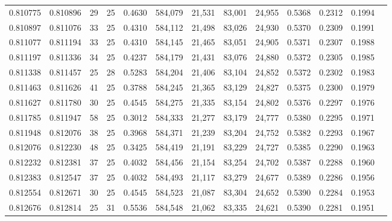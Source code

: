 \begin{tabular}{rrrrrrrrrrrrr}
0.810775 & 0.810896 &    29 &  25 &                                     0.4630 & 584,079 &  21,531 &  83,001 &  24,955 & 0.5368 & 0.2312 & 0.1994 \\
0.810897 & 0.811076 &    33 &  25 &                                     0.4310 & 584,112 &  21,498 &  83,026 &  24,930 & 0.5370 & 0.2309 & 0.1991 \\
0.811077 & 0.811194 &    33 &  25 &                                     0.4310 & 584,145 &  21,465 &  83,051 &  24,905 & 0.5371 & 0.2307 & 0.1988 \\
0.811197 & 0.811336 &    34 &  25 &                                     0.4237 & 584,179 &  21,431 &  83,076 &  24,880 & 0.5372 & 0.2305 & 0.1985 \\
0.811338 & 0.811457 &    25 &  28 &                                     0.5283 & 584,204 &  21,406 &  83,104 &  24,852 & 0.5372 & 0.2302 & 0.1983 \\
0.811463 & 0.811626 &    41 &  25 &                                     0.3788 & 584,245 &  21,365 &  83,129 &  24,827 & 0.5375 & 0.2300 & 0.1979 \\
0.811627 & 0.811780 &    30 &  25 &                                     0.4545 & 584,275 &  21,335 &  83,154 &  24,802 & 0.5376 & 0.2297 & 0.1976 \\
0.811785 & 0.811947 &    58 &  25 &                                     0.3012 & 584,333 &  21,277 &  83,179 &  24,777 & 0.5380 & 0.2295 & 0.1971 \\
0.811948 & 0.812076 &    38 &  25 &                                     0.3968 & 584,371 &  21,239 &  83,204 &  24,752 & 0.5382 & 0.2293 & 0.1967 \\
0.812076 & 0.812230 &    48 &  25 &                                     0.3425 & 584,419 &  21,191 &  83,229 &  24,727 & 0.5385 & 0.2290 & 0.1963 \\
0.812232 & 0.812381 &    37 &  25 &                                     0.4032 & 584,456 &  21,154 &  83,254 &  24,702 & 0.5387 & 0.2288 & 0.1960 \\
0.812383 & 0.812547 &    37 &  25 &                                     0.4032 & 584,493 &  21,117 &  83,279 &  24,677 & 0.5389 & 0.2286 & 0.1956 \\
0.812554 & 0.812671 &    30 &  25 &                                     0.4545 & 584,523 &  21,087 &  83,304 &  24,652 & 0.5390 & 0.2284 & 0.1953 \\
0.812676 & 0.812814 &    25 &  31 &                                     0.5536 & 584,548 &  21,062 &  83,335 &  24,621 & 0.5390 & 0.2281 & 0.1951 \\

\end{tabular}
